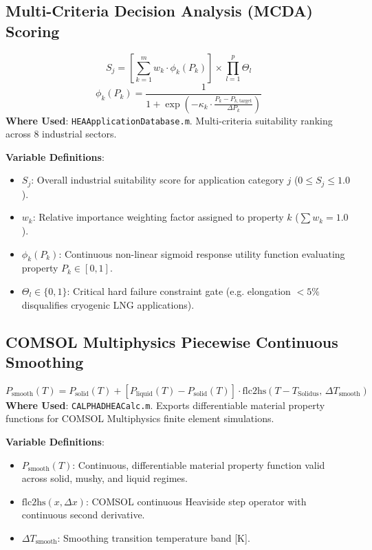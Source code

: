 \documentclass[11pt,a4paper]{article}
\begin{document}
\subsection{Multi-Criteria Decision Analysis (MCDA) Scoring}
\begin{equation}
S_j = \left[ \sum_{k=1}^m w_k \cdot \phi_k(P_k) \right] \times \prod_{l=1}^p \Theta_l
\end{equation}
\begin{equation}
\phi_k(P_k) = \frac{1}{1 + \exp\left(-\kappa_k \cdot \frac{P_k - P_{k, \text{target}}}{\Delta P_k}\right)}
\end{equation}
\textbf{Where Used}: \texttt{HEAApplicationDatabase.m}. Multi-criteria suitability ranking across 8 industrial sectors.

\noindent\textbf{Variable Definitions}:
\begin{itemize}
  \item $S_j$: Overall industrial suitability score for application category $j$ ($0 \le S_j \le 1.0$).
  \item $w_k$: Relative importance weighting factor assigned to property $k$ ($\sum w_k = 1.0$).
  \item $\phi_k(P_k)$: Continuous non-linear sigmoid response utility function evaluating property $P_k \in [0, 1]$.
  \item $\Theta_l \in \{0, 1\}$: Critical hard failure constraint gate (e.g. elongation $< 5\%$ disqualifies cryogenic LNG applications).
\end{itemize}

\subsection{COMSOL Multiphysics Piecewise Continuous Smoothing}
\begin{equation}
P_{\text{smooth}}(T) = P_{\text{solid}}(T) + \left[P_{\text{liquid}}(T) - P_{\text{solid}}(T)\right] \cdot \text{flc2hs}\left(T - T_{\text{Solidus}}, \, \Delta T_{\text{smooth}}\right)
\end{equation}
\textbf{Where Used}: \texttt{CALPHADHEACalc.m}. Exports differentiable material property functions for COMSOL Multiphysics finite element simulations.

\noindent\textbf{Variable Definitions}:
\begin{itemize}
  \item $P_{\text{smooth}}(T)$: Continuous, differentiable material property function valid across solid, mushy, and liquid regimes.
  \item $\text{flc2hs}(x, \Delta x)$: COMSOL continuous Heaviside step operator with continuous second derivative.
  \item $\Delta T_{\text{smooth}}$: Smoothing transition temperature band [$\text{K}$].
\end{itemize}
\end{document}
